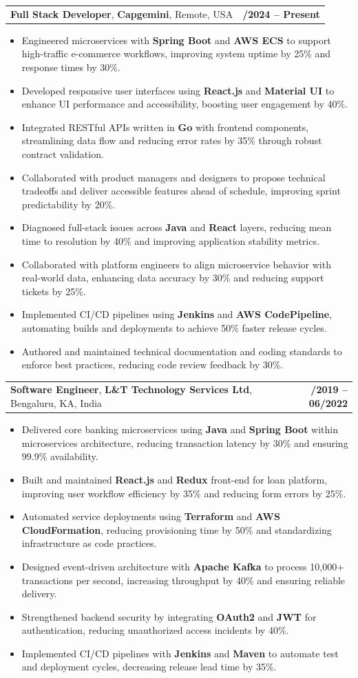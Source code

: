\documentclass[letterpaper,11pt]{article}
\makeatletter
\newcommand{\resumeItem}[1]{
  \item\footnotesize{
    {#1 \vspace{-2pt}}
  }
}
\newcommand{\resumeSubheading}[4]{
  \vspace{-2pt}\item
    \begin{tabular*}{1.0\textwidth}[t]{l@{\extracolsep{\fill}}r}
      \textbf{\fontsize{10pt}{14pt}\selectfont #3}, \textbf{\fontsize{10pt}{14pt}\selectfont #1}, \fontsize{10pt}{14pt}\selectfont #4 & \textbf{\fontsize{10pt}{14pt}\selectfont #2} \\
    \end{tabular*}\vspace{-7pt}
}
\newcommand{\resumeItemListStart}{\begin{itemize}[leftmargin=*]}
\newcommand{\resumeItemListEnd}{\end{itemize}\vspace{-5pt}}
\makeatother
\begin{document}
    \resumeSubheading
        {Capgemini}{01/2024 -- Present}
        {Full Stack Developer}{Remote, USA}
      \resumeItemListStart
        \resumeItem{Engineered microservices with \textbf{Spring Boot} and \textbf{AWS ECS} to support high-traffic e-commerce workflows, improving system uptime by 25\% and response times by 30\%.}
        \resumeItem{Developed responsive user interfaces using \textbf{React.js} and \textbf{Material UI} to enhance UI performance and accessibility, boosting user engagement by 40\%.}
        \resumeItem{Integrated RESTful APIs written in \textbf{Go} with frontend components, streamlining data flow and reducing error rates by 35\% through robust contract validation.}
        \resumeItem{Collaborated with product managers and designers to propose technical tradeoffs and deliver accessible features ahead of schedule, improving sprint predictability by 20\%.}
        \resumeItem{Diagnosed full-stack issues across \textbf{Java} and \textbf{React} layers, reducing mean time to resolution by 40\% and improving application stability metrics.}
        \resumeItem{Collaborated with platform engineers to align microservice behavior with real-world data, enhancing data accuracy by 30\% and reducing support tickets by 25\%.}
        \resumeItem{Implemented CI/CD pipelines using \textbf{Jenkins} and \textbf{AWS CodePipeline}, automating builds and deployments to achieve 50\% faster release cycles.}
        \resumeItem{Authored and maintained technical documentation and coding standards to enforce best practices, reducing code review feedback by 30\%.}
      \resumeItemListEnd

    \resumeSubheading
        {L\&T Technology Services Ltd}{08/2019 -- 06/2022}
        {Software Engineer}{Bengaluru, KA, India}
      \resumeItemListStart
        \resumeItem{Delivered core banking microservices using \textbf{Java} and \textbf{Spring Boot} within microservices architecture, reducing transaction latency by 30\% and ensuring 99.9\% availability.}
        \resumeItem{Built and maintained \textbf{React.js} and \textbf{Redux} front-end for loan platform, improving user workflow efficiency by 35\% and reducing form errors by 25\%.}
        \resumeItem{Automated service deployments using \textbf{Terraform} and \textbf{AWS CloudFormation}, reducing provisioning time by 50\% and standardizing infrastructure as code practices.}
        \resumeItem{Designed event-driven architecture with \textbf{Apache Kafka} to process 10,000+ transactions per second, increasing throughput by 40\% and ensuring reliable delivery.}
        \resumeItem{Strengthened backend security by integrating \textbf{OAuth2} and \textbf{JWT} for authentication, reducing unauthorized access incidents by 40\%.}
        \resumeItem{Implemented CI/CD pipelines with \textbf{Jenkins} and \textbf{Maven} to automate test and deployment cycles, decreasing release lead time by 35\%.}
      \resumeItemListEnd
\end{document}
